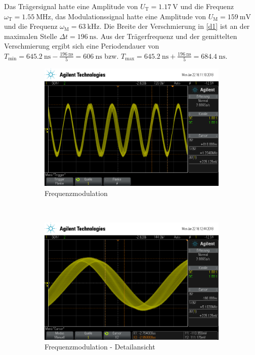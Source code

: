 Das Trägersignal hatte eine Amplitude von $U_\text{T}=\SI{1.17}{\volt}$ und die Frequenz $\omega_\text{T}=\SI{1.55}{\mega\hertz}$, das Modulationssignal hatte eine Amplitude von $U_\text{M}=\SI{159}{\milli\volt}$ und die Frequenz $\omega_\text{M}=\SI{63}{\kilo\hertz}$. Die Breite der Verschmierung in \autoref{d1} ist an der maximalen Stelle $\Delta t = \SI{196}{\nano\second}$. Aus der Trägerfrequenz und der gemittelten Verschmierung ergibt sich eine Periodendauer von $T_\text{min} = \SI{645.2}{\nano\second} - \frac{\SI{196}{\nano\second}}{5} = \SI{606}{\nano\second}$ bzw. $T_\text{max} = \SI{645.2}{\nano\second} + \frac{\SI{196}{\nano\second}}{5} = \SI{684.4}{\nano\second}$.

\begin{figure}[t!]
	\centering
	\begin{subfigure}[t]{0.5\textwidth}
		\centering
		\includegraphics[width=\textwidth]{img/d_scope_233.png}
		\caption{Frequenzmodulation}
	\end{subfigure}%
	~
	\begin{subfigure}[t]{0.5\textwidth}
		\centering
		\includegraphics[width=\textwidth]{img/d_scope_234.png}
		\caption{Frequenzmodulation - Detailansicht}
	\end{subfigure}
	\caption{}
	\label{d1}
\end{figure}

